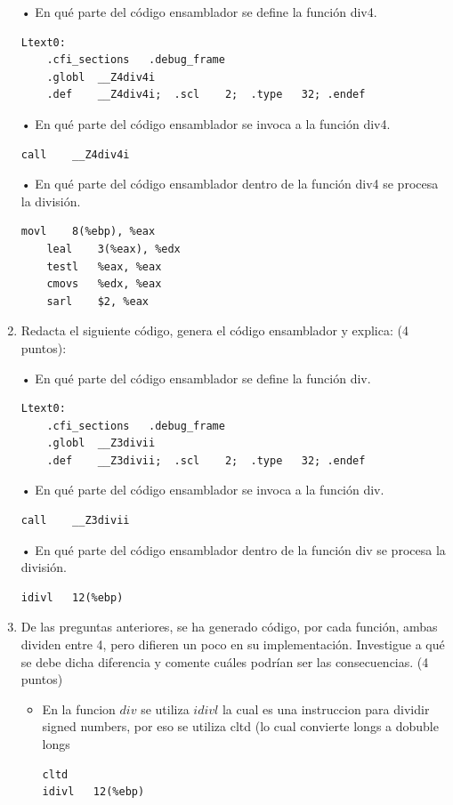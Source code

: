 \documentclass{article}
\begin{document}
\begin{enumerate}
		•	En qué parte del código ensamblador se define la función div4.
	\begin{lstlisting}[language={[x86masm]Assembler}, basicstyle=\small]
	Ltext0:
	.cfi_sections	.debug_frame
	.globl	__Z4div4i
	.def	__Z4div4i;	.scl	2;	.type	32;	.endef
	  \end{lstlisting}	
•	En qué parte del código ensamblador se invoca a la función div4.\newline
\begin{lstlisting}[language={[x86masm]Assembler}, basicstyle=\small]
	call	__Z4div4i
 \end{lstlisting}	
•	En qué parte del código ensamblador dentro de la función div4 se procesa la división.
\begin{lstlisting}[language={[x86masm]Assembler}, basicstyle=\small]
	movl	8(%ebp), %eax
	leal	3(%eax), %edx
	testl	%eax, %eax
	cmovs	%edx, %eax
	sarl	$2, %eax
\end{lstlisting}


    	\item  Redacta el siguiente código, genera el código ensamblador y explica: (4 puntos):
		
		•	En qué parte del código ensamblador se define la función div.
\begin{lstlisting}[language={[x86masm]Assembler}, basicstyle=\small]
	Ltext0:
	.cfi_sections	.debug_frame
	.globl	__Z3divii
	.def	__Z3divii;	.scl	2;	.type	32;	.endef
	 \end{lstlisting}
•	En qué parte del código ensamblador se invoca a la función div.
\begin{lstlisting}[language={[x86masm]Assembler}, basicstyle=\small]
call	__Z3divii
\end{lstlisting}
•	En qué parte del código ensamblador dentro de la función div se procesa la división.
\begin{lstlisting}[language={[x86masm]Assembler}, basicstyle=\small]
idivl	12(%ebp)
\end{lstlisting}


 	 \item De las preguntas anteriores, se ha generado código, por cada función, ambas dividen entre 4,
pero difieren un poco en su implementación. Investigue a qué se debe dicha diferencia y comente cuáles podrían ser las consecuencias. (4 puntos)

\begin{itemize}
    \item En la funcion $div$ se utiliza $idivl$ la cual es una instruccion para dividir signed numbers, por eso se utiliza cltd (lo cual convierte longs a dobuble longs
\begin{lstlisting}[language={[x86masm]Assembler}, basicstyle=\small]
cltd
idivl	12(%ebp)
\end{lstlisting}


\end{itemize}
\end{enumerate}
\end{document}
